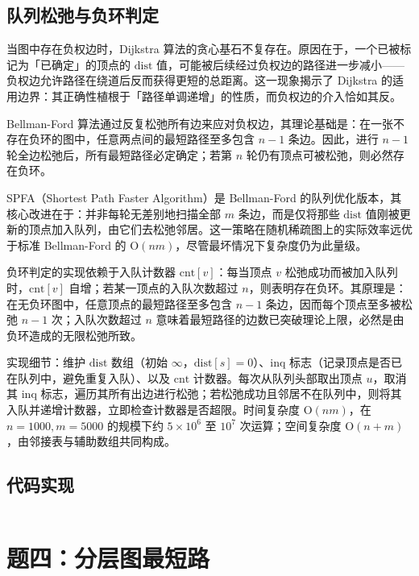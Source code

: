 \documentclass[12pt, a4paper]{academics}
\begin{document}
\subsection{队列松弛与负环判定}

当图中存在负权边时，Dijkstra 算法的贪心基石不复存在。原因在于，一个已被标记为「已确定」的顶点的 $\mathrm{dist}$ 值，可能被后续经过负权边的路径进一步减小——负权边允许路径在绕道后反而获得更短的总距离。这一现象揭示了 Dijkstra 的适用边界：其正确性植根于「路径单调递增」的性质，而负权边的介入恰如其反。

Bellman-Ford 算法通过反复松弛所有边来应对负权边，其理论基础是：在一张不存在负环的图中，任意两点间的最短路径至多包含 $n-1$ 条边。因此，进行 $n-1$ 轮全边松弛后，所有最短路径必定确定；若第 $n$ 轮仍有顶点可被松弛，则必然存在负环。

SPFA（Shortest Path Faster Algorithm）是 Bellman-Ford 的队列优化版本，其核心改进在于：并非每轮无差别地扫描全部 $m$ 条边，而是仅将那些 $\mathrm{dist}$ 值刚被更新的顶点加入队列，由它们去松弛邻居。这一策略在随机稀疏图上的实际效率远优于标准 Bellman-Ford 的 $\mathrm{O}(nm)$，尽管最坏情况下复杂度仍为此量级。

负环判定的实现依赖于入队计数器 $\mathrm{cnt}[v]$：每当顶点 $v$ 松弛成功而被加入队列时，$\mathrm{cnt}[v]$ 自增；若某一顶点的入队次数超过 $n$，则表明存在负环。其原理是：在无负环图中，任意顶点的最短路径至多包含 $n-1$ 条边，因而每个顶点至多被松弛 $n-1$ 次；入队次数超过 $n$ 意味着最短路径的边数已突破理论上限，必然是由负环造成的无限松弛所致。

实现细节：维护 $\mathrm{dist}$ 数组（初始 $\infty$，$\mathrm{dist}[s]=0$）、$\mathrm{inq}$ 标志（记录顶点是否已在队列中，避免重复入队）、以及 $\mathrm{cnt}$ 计数器。每次从队列头部取出顶点 $u$，取消其 $\mathrm{inq}$ 标志，遍历其所有出边进行松弛；若松弛成功且邻居不在队列中，则将其入队并递增计数器，立即检查计数器是否超限。时间复杂度 $\mathrm{O}(nm)$，在 $n=1000, m=5000$ 的规模下约 $5 \times 10^6$ 至 $10^7$ 次运算；空间复杂度 $\mathrm{O}(n+m)$，由邻接表与辅助数组共同构成。

\subsection{代码实现}

\inputminted{c++}{../src/p3_spfa.cpp}

\section{题四：分层图最短路}
\end{document}

